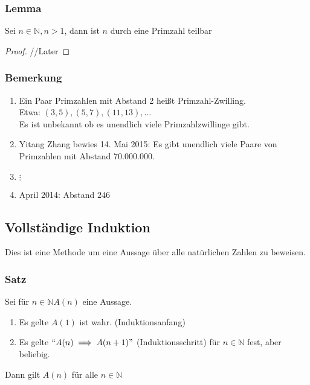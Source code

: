 \documentclass{article}
\begin{document}
    \subsubsection{Lemma}
      Sei $n \in \mathbb{N}, n>1$, dann ist $n$ durch eine Primzahl teilbar
      \begin{proof}
        //Later
      \end{proof}

    \subsubsection{Bemerkung}
      \begin{enumerate}[label=(\roman*)]
        \item Ein Paar Primzahlen mit Abstand 2 heißt Primzahl-Zwilling.\\
          Etwa: $(3,5), (5,7), (11,13), \dotsc$ \\
          Es ist unbekannt ob es unendlich viele Primzahlzwillinge gibt.
        \item Yitang Zhang bewies 14. Mai 2015: Es gibt unendlich viele Paare von
          Primzahlen mit Abstand $70.000.000$.
        \item $\vdots$
        \item April 2014: Abstand $246$
      \end{enumerate}

  \subsection{Vollständige Induktion}
    Dies ist eine Methode um eine Aussage über alle natürlichen Zahlen zu beweisen.

    \subsubsection{Satz}
      Sei für $n \in \mathbb{N} A(n)$ eine Aussage.
      \begin{enumerate}[label=(\roman*)]
        \item Es gelte $A(1)$ ist wahr. (Induktionsanfang)
        \item Es gelte $``A(n) \implies A(n+1)"$ (Induktionsschritt) für
          $n \in \mathbb{N}$ fest, aber beliebig.
      \end{enumerate}

      Dann gilt $A(n)$ für alle $n \in \mathbb{N}$
\end{document}
